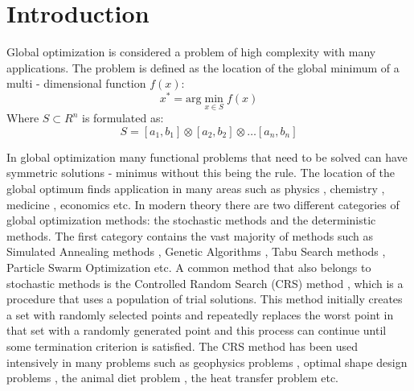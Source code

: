 \documentclass[symmetry,article,submit,moreauthors,pdftex]{Definitions/mdpi}
\begin{document}
\section{Introduction }

Global optimization\cite{GO1} is considered a problem of high complexity
with many applications. The problem is defined as the location of
the global minimum of a multi - dimensional function $f(x)$:
\begin{equation}
x^{*}=\mbox{arg}\min_{x\in S}f(x)\label{eq:eq1}
\end{equation}
Where $S\subset R^{n}$ is formulated as: 
\begin{equation}
S=\left[a_{1},b_{1}\right]\otimes\left[a_{2},b_{2}\right]\otimes\ldots\left[a_{n},b_{n}\right]\label{eq:eq2}
\end{equation}

In global optimization many functional problems that need to be solved can have symmetric solutions - minimus without this being the rule. The location of the global optimum finds application in many  areas such as physics
\cite{physics1,physics2}, chemistry \cite{chemistry1,chemistry2},
medicine \cite{med1,med2}, economics\cite{econ1} etc. In modern
theory there are two different categories of global optimization methods:
the stochastic methods and the deterministic methods.  The first category
contains the vast majority of methods such as Simulated Annealing
methods \cite{simann_major,simann1,simann2}, Genetic Algorithms \cite{ga1,ga2,ga3},
Tabu Search methods \cite{tabu1}, Particle Swarm Optimization \cite{pso_major,pso1,pso2}
etc. A common method that also belongs to stochastic methods is the
Controlled Random Search (CRS) method \cite{crs1}, which is a procedure that uses a population of trial solutions. This method initially creates a set with randomly
selected points and repeatedly replaces the worst point in that set
with a randomly generated point and this process can continue until some termination criterion is satisfied. The CRS method has been used intensively
in many problems such as geophysics problems \cite{crs_geophysics,crs_geophysics2},
optimal shape design problems \cite{crs_optimalshape1}, the animal
diet problem \cite{crs_animaldiet1}, the heat transfer problem \cite{crs_heat1}
etc. 
\end{document}
